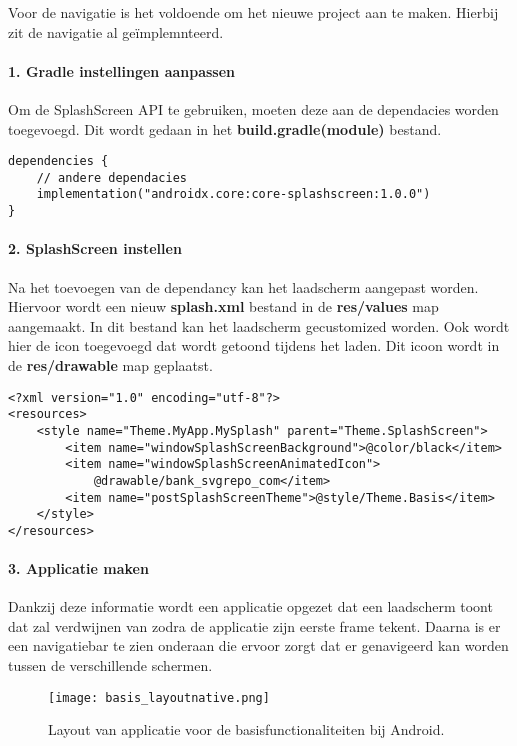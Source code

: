 Voor de navigatie is het voldoende om het nieuwe project aan te maken. 
Hierbij zit de navigatie al geïmplemnteerd.

\paragraph{1. Gradle instellingen aanpassen}
Om de SplashScreen API te gebruiken, moeten deze aan de dependacies worden toegevoegd. Dit wordt gedaan in
het \textbf{build.gradle(module)} bestand.
\begin{verbatim}
dependencies {
    // andere dependacies
    implementation("androidx.core:core-splashscreen:1.0.0")
}
\end{verbatim}

\paragraph{2. SplashScreen instellen}
Na het toevoegen van de dependancy kan het laadscherm aangepast worden. 
Hiervoor wordt een nieuw \textbf{splash.xml} bestand in de \textbf{res/values} map aangemaakt. In dit 
bestand kan het laadscherm gecustomized worden. Ook wordt hier de icon toegevoegd dat wordt
getoond tijdens het laden. Dit icoon wordt in de \textbf{res/drawable} map geplaatst.
\begin{verbatim}
<?xml version="1.0" encoding="utf-8"?>
<resources>
    <style name="Theme.MyApp.MySplash" parent="Theme.SplashScreen">
        <item name="windowSplashScreenBackground">@color/black</item>
        <item name="windowSplashScreenAnimatedIcon">
            @drawable/bank_svgrepo_com</item>
        <item name="postSplashScreenTheme">@style/Theme.Basis</item>
    </style>
</resources>
\end{verbatim}

\paragraph{3. Applicatie maken}
Dankzij deze informatie wordt een applicatie opgezet dat een laadscherm toont dat zal verdwijnen 
van zodra de applicatie zijn eerste frame tekent. Daarna is er een navigatiebar te zien onderaan die ervoor zorgt dat 
er genavigeerd kan worden tussen de verschillende schermen.
\begin{figure}[H]
    \centering
    \texttt{[image: basis\_layoutnative.png]}
    \caption{Layout van applicatie voor de basisfunctionaliteiten bij Android.}
\end{figure}

